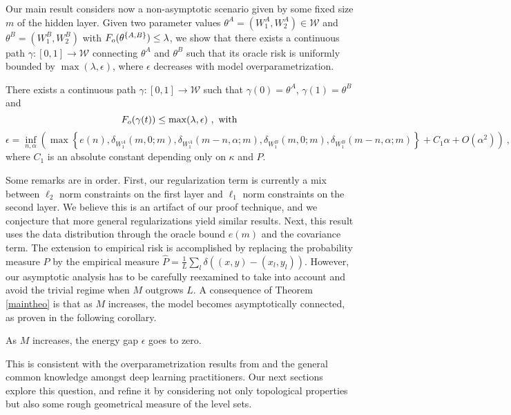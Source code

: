 Our main result considers now a non-asymptotic scenario given by some fixed
size $m$ of the hidden layer. Given two parameter values $\theta^A = (W_1^A, W_2^A) \in \mathcal{W}$ 
and $\theta^B= (W_1^B, W_2^B)$ with $F_{o}(\theta^{\{A,B\} } ) \leq \lambda$, 
we show that there exists a continuous path 
$\gamma: [0,1] \to \mathcal{W}$ connecting $\theta^A$ and $\theta^B$ 
such that its oracle risk is uniformly bounded by $\max(\lambda, \epsilon)$, where $\epsilon$ 
decreases with model overparametrization. 
\begin{theorem}
\label{maintheo}
There exists a continuous path $\gamma: [0,1] \to \mathcal{W}$ such that
$\gamma(0) = \theta^A$, $\gamma(1) = \theta^B$ and
\begin{equation}
F_{o}( \gamma(t) )  \leq \max( \lambda, \epsilon)~,\text{ with}
\end{equation}
\begin{equation}
\epsilon = \inf_{n, \alpha} \left(\max \left\{ e(n), \delta_{W_1^A}(m, 0; m ) , \delta_{W_1^A}(m-n, \alpha; m ) ,  \delta_{W_1^B}(m, 0; m ) , \delta_{W_1^B}(m-n, \alpha; m ) \right\} + C_1 \alpha  + O(\alpha^2) \right)~,
\end{equation}
where $C_1$ is an absolute constant depending only on $\kappa$ and $P$.
\end{theorem}
Some remarks are in order. First, our regularization term is currently a mix between $\ell_2$ norm constraints on the first layer and $\ell_1$ norm constraints on the second layer. We believe this is an artifact of our proof technique, and we conjecture that more general regularizations yield similar results. Next, this result uses the data distribution through the oracle bound $e(m)$ and the covariance term. The 
extension to empirical risk is accomplished by replacing the probability measure $P$ by the empirical measure $\hat{P} = \frac{1}{L} \sum_l \delta\left( (x,y) - (x_l, y_l)\right) $. However, our asymptotic analysis has to be carefully reexamined to take into account and avoid the trivial regime when $M$ outgrows $L$.  
A consequence of Theorem \ref{maintheo} is that as $M$ increases, the model becomes asymptotically connected, as proven in the following corollary.
\begin{corollary}
\label{maincoro}
As $M$ increases, the energy gap $\epsilon$ goes to zero.
\end{corollary}
This is consistent with the overparametrization results from \cite{safran2015quality,shamir2} and the general common knowledge amongst deep learning practitioners. Our next sections explore this question, and refine it by considering not only topological properties but also some rough geometrical measure of the level sets.








